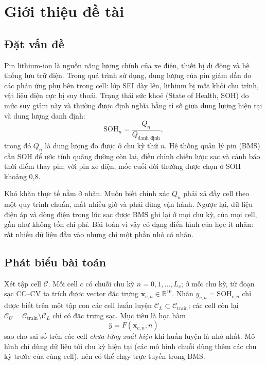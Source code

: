 \documentclass[12pt,a4paper,oneside]{report}
\theoremstyle{plain}
\theoremstyle{definition}
\newcommand{\R}{\mathbb{R}}
\begin{document}
\clearpage{}

\chapter{Giới thiệu đề tài}\label{ch:gioithieu}

\section{Đặt vấn đề}

Pin lithium-ion là nguồn năng lượng chính của xe điện, thiết bị di động và hệ thống lưu trữ điện. Trong
quá trình sử dụng, dung lượng của pin giảm dần do các phản ứng phụ bên trong cell: lớp SEI dày lên, lithium
bị mất khỏi chu trình, vật liệu điện cực bị suy thoái. Trạng thái sức khoẻ (State of Health, SOH) đo mức
suy giảm này và thường được định nghĩa bằng tỉ số giữa dung lượng hiện tại và dung lượng danh định:
\begin{equation}
\mathrm{SOH}_n = \frac{Q_n}{Q_\text{danh định}},
\end{equation}
trong đó $Q_n$ là dung lượng đo được ở chu kỳ thứ $n$. Hệ thống quản lý pin (BMS) cần SOH để ước tính quãng
đường còn lại, điều chỉnh chiến lược sạc và cảnh báo thời điểm thay pin; với pin xe điện, mốc cuối đời
thường được chọn ở SOH khoảng 0,8.

Khó khăn thực tế nằm ở nhãn. Muốn biết chính xác $Q_n$ phải xả đầy cell theo một quy trình chuẩn, mất nhiều
giờ và phải dừng vận hành. Ngược lại, dữ liệu điện áp và dòng điện trong lúc sạc được BMS ghi lại ở mọi chu
kỳ, của mọi cell, gần như không tốn chi phí. Bài toán vì vậy có dạng điển hình của học ít nhãn: rất nhiều dữ
liệu đầu vào nhưng chỉ một phần nhỏ có nhãn.

\section{Phát biểu bài toán}

Xét tập cell $\mathcal{C}$. Mỗi cell $c$ có chuỗi chu kỳ $n = 0,1,\dots,L_c$; ở mỗi chu kỳ, từ đoạn sạc
CC--CV ta trích được vector đặc trưng $\mathbf{x}_{c,n} \in \R^{16}$. Nhãn $y_{c,n} = \mathrm{SOH}_{c,n}$
chỉ được biết trên một tập con các cell huấn luyện $\mathcal{C}_L \subset \mathcal{C}_\text{train}$; các cell
còn lại $\mathcal{C}_U = \mathcal{C}_\text{train} \setminus \mathcal{C}_L$ chỉ có đặc trưng sạc. Mục tiêu là
học hàm
\begin{equation}
\hat y = F(\mathbf{x}_{c,n}, n)
\end{equation}
sao cho sai số trên các cell \emph{chưa từng xuất hiện} khi huấn luyện là nhỏ nhất. Mô hình chỉ dùng dữ liệu
tới chu kỳ hiện tại (các mô hình chuỗi dùng thêm các chu kỳ trước của cùng cell), nên có thể chạy trực tuyến trong BMS.
\end{document}
